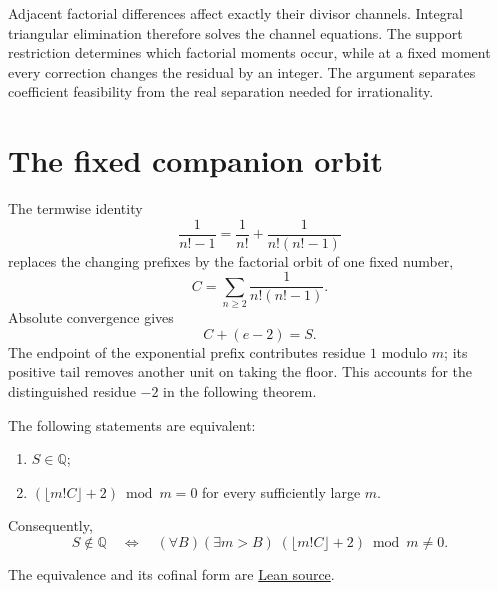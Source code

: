 \documentclass[11pt]{article}
\newcommand{\Ser}{S}
\begin{document}
Adjacent factorial differences affect exactly their divisor channels.
Integral triangular elimination therefore solves the channel equations.
The support restriction determines which factorial moments occur, while
at a fixed moment every correction changes the residual by an integer.
The argument separates coefficient feasibility from the real separation
needed for irrationality.

\section{The fixed companion orbit}\label{sec:companion-orbit}

The termwise identity
\[
\frac1{n!-1}=\frac1{n!}+\frac1{n!(n!-1)}
\]
replaces the changing prefixes by the factorial orbit of one fixed number,
\[
C=\sum_{n\ge2}\frac1{n!(n!-1)}.
\]
Absolute convergence gives
\begin{equation}C+(e-2)=\Ser.\label{eq:companion-decomposition}\end{equation}
The endpoint of the exponential prefix contributes residue $1$ modulo $m$;
its positive tail removes another unit on taking the floor.  This accounts
for the distinguished residue $-2$ in the following theorem.

\begin{theorem}
\label{res:companion-orbit-rationality-boundary}
The following statements are equivalent:
\begin{enumerate}
\item $\Ser\in\mathbb Q$;
\item $(\lfloor m!C\rfloor+2)\bmod m=0$ for every sufficiently large $m$.
\end{enumerate}
Consequently,
\begin{equation}
 \Ser\notin\mathbb Q
 \quad\Longleftrightarrow\quad
 (\forall B)(\exists m>B)\;
   (\lfloor m!C\rfloor+2)\bmod m\ne0 .
 \label{eq:companion-cofinal}
\end{equation}
\end{theorem}

\noindent The equivalence and its cofinal form are
\href{https://github.com/wcook04/plectis-erdos/blob/f36a98bf3d3e6f65f1074e3b800e3293d5b8a51a/ErdosProblems/Erdos68/PaperCompleteExisting.lean#L29}{Lean source}.
\end{document}
